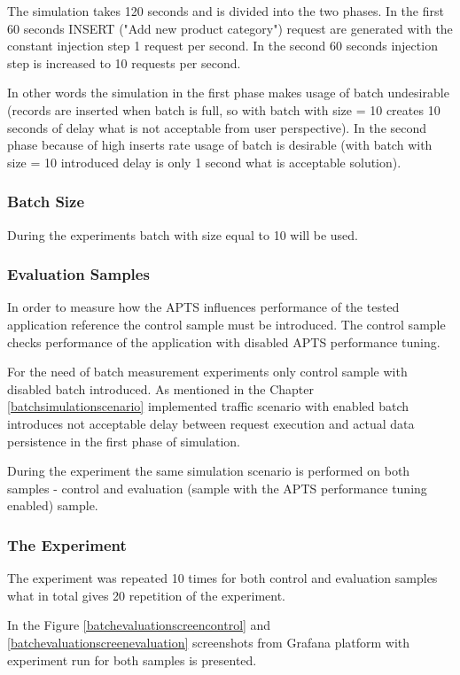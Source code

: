 \documentclass[12pt,a4paper]{article}
\begin{document}
The simulation takes 120 seconds and is divided into the two phases. In the first 60 seconds INSERT ("Add new product category") request are generated with the constant injection step 1 request per second. In the second 60 seconds injection step is increased to 10 requests per second. 

In other words the simulation in the first phase makes usage of batch undesirable (records are inserted when batch is full, so with batch with size = 10 creates 10 seconds of delay what is not acceptable from user perspective). In the second phase because of high inserts rate usage of batch is desirable (with batch with size = 10 introduced delay is only 1 second what is acceptable solution).  
 
\subsubsection{Batch Size} 
During the experiments batch with size equal to 10 will be used. 


\subsubsection{Evaluation Samples} 

In order to measure how the APTS influences performance of the tested application reference the control sample must be introduced. The control sample checks performance of the application with disabled APTS performance tuning. 

For the need of batch measurement experiments only control sample with disabled batch introduced. As mentioned in the Chapter \ref{batchsimulationscenario} implemented traffic scenario with enabled batch introduces not acceptable delay between request execution and actual data persistence in the first phase of simulation. 

During the experiment the same simulation scenario is performed on both samples - control and evaluation (sample with the APTS performance tuning enabled) sample.

\subsubsection{The Experiment} 

The experiment was repeated 10 times for both control and evaluation samples what in total gives 20 repetition of the experiment. 

In the Figure \ref{batchevaluationscreencontrol} and \ref{batchevaluationscreenevaluation} screenshots from Grafana platform with experiment run for both samples is presented. 
\end{document}
